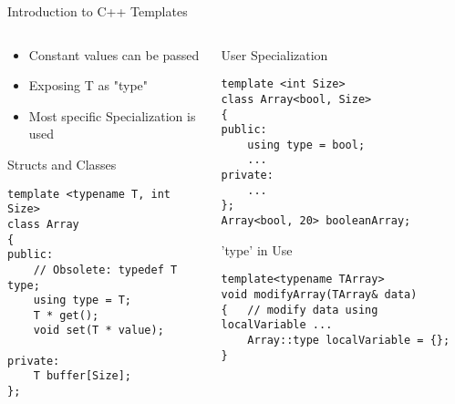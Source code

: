 \documentclass[aspectratio=169]{beamer}
\begin{document}

\begin{frame}[fragile]{Introduction to C++ Templates}

    \begin{columns}[t] 
        \begin{column}{0.5\textwidth}
        
            \begin{itemize}
                \item Constant values can be passed 
                \item Exposing T as "type"
                \item Most specific Specialization is used
            \end{itemize}
        
            \scriptsize
            \begin{block}{Structs and Classes}
                \begin{verbatim}
template <typename T, int Size>
class Array
{
public:
    // Obsolete: typedef T type;
    using type = T; 
    T * get(); 
    void set(T * value);
    
private:
    T buffer[Size];
};
                \end{verbatim}
            \end{block}
        \end{column}
        
        \begin{column}{0.5\textwidth}
        
            \scriptsize
            \begin{block}{User Specialization}
                \begin{verbatim}
template <int Size>
class Array<bool, Size>
{
public:
    using type = bool; 
    ...
private:
    ...
};
Array<bool, 20> booleanArray;
                \end{verbatim}
            \end{block}
            
            \begin{block}{'type' in Use}
                \begin{verbatim}
template<typename TArray>
void modifyArray(TArray& data) 
{   // modify data using localVariable ...
    Array::type localVariable = {}; 
}   
                \end{verbatim}
            \end{block}
        \end{column}
    \end{columns}
    
\end{frame}
\end{document}
